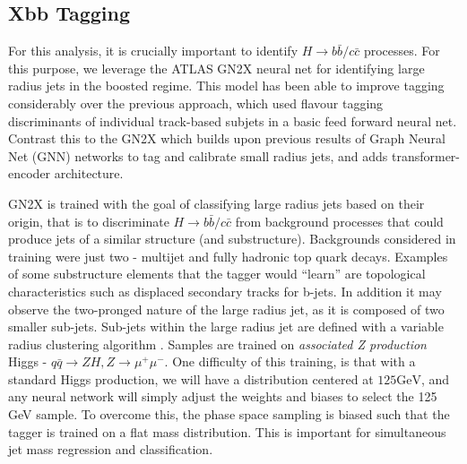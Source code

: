 \documentclass[12pt]{article}
\begin{document}
\subsection{Xbb Tagging}
For this analysis, it is crucially important to identify $H\rightarrow b\bar{b}
/ c\bar{c}$ processes. For this purpose, we leverage the ATLAS GN2X neural net
for identifying large radius jets in the boosted regime. This model has been
able to improve tagging considerably over the previous approach, which used
flavour tagging discriminants of individual track-based subjets in a basic feed
forward neural net. Contrast this to the GN2X which builds upon previous results
of Graph Neural Net (GNN) networks to tag and calibrate small radius jets, and
adds transformer-encoder architecture.


GN2X is trained with the goal of classifying large radius jets based on their
origin, that is to discriminate $H\rightarrow b\bar{b}/c\bar{c}$ from background
processes that could produce jets of a similar structure (and substructure).
Backgrounds considered in training were just two - multijet and fully hadronic
top quark decays. Examples of some substructure elements that the tagger would
``learn'' are topological characteristics such as displaced secondary tracks for
b-jets. In addition it may observe the two-pronged nature of the large radius
jet, as it is composed of two smaller sub-jets. Sub-jets within the large radius
jet are defined with a variable radius clustering algorithm
\cite{jet_substructure}. Samples are trained on \textit{associated Z production}
Higgs - $q\bar{q}\rightarrow ZH, Z\rightarrow \mu^+\mu^-$. One difficulty of
this training, is that with a standard Higgs production, we will have a
distribution centered at $125 \text{GeV}$, and any neural network will simply
adjust the weights and biases to select the 125 GeV sample. To overcome this,
the phase space sampling is biased such that the tagger is trained on a flat
mass distribution. This is important for simultaneous jet mass regression and
classification.
\end{document}
